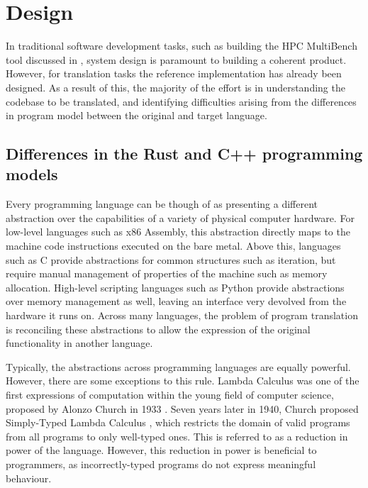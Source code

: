 \section{Design}
\label{sec:translation-design}

In traditional software development tasks, such as building the HPC MultiBench tool discussed in , system design is paramount to building a coherent product. However, for translation tasks the reference implementation has already been designed. As a result of this, the majority of the effort is in understanding the codebase to be translated, and identifying difficulties arising from the differences in program model between the original and target language.

\subsection{Differences in the Rust and C++ programming models}
\label{sec:rust-cpp-programming-models}

Every programming language can be though of as presenting a different abstraction over the capabilities of a variety of physical computer hardware. For low-level languages such as x86 Assembly, this abstraction directly maps to the machine code instructions executed on the bare metal. Above this, languages such as C provide abstractions for common structures such as iteration, but require manual management of properties of the machine such as memory allocation. High-level scripting languages such as Python provide abstractions over memory management as well, leaving an interface very devolved from the hardware it runs on. Across many languages, the problem of program translation is reconciling these abstractions to allow the expression of the original functionality in another language.

Typically, the abstractions across programming languages are equally powerful. However, there are some exceptions to this rule. Lambda Calculus was one of the first expressions of computation within the young field of computer science, proposed by Alonzo Church in 1933 \cite{church1932set}. Seven years later in 1940, Church proposed Simply-Typed Lambda Calculus \cite{church1940formulation}, which restricts the domain of valid programs from all programs to only well-typed ones. This is referred to as a reduction in power of the language. However, this reduction in power is beneficial to programmers, as incorrectly-typed programs do not express meaningful behaviour.

